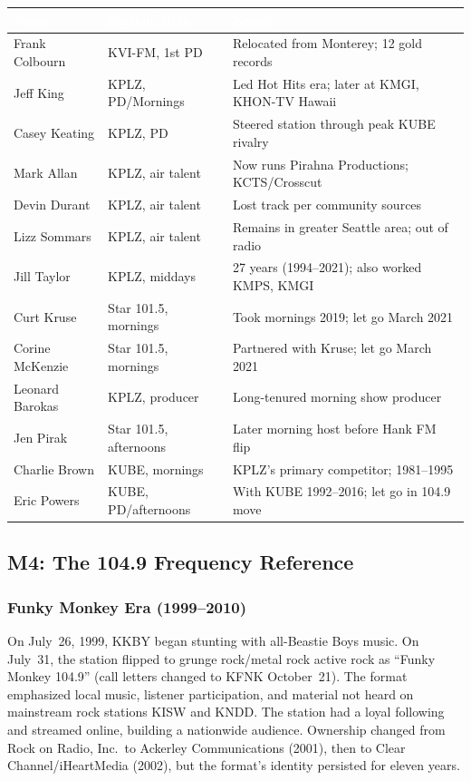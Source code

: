 \documentclass[11pt,letterpaper]{article}
\newcommand{\tableheader}[1]{\textbf{\sffamily\textcolor{white}{#1}}}
\begin{document}
\begin{center}
\begin{tabularx}{\textwidth}{L{3cm}L{2.5cm}X}
\toprule
{}
\tableheader{Name} & \tableheader{Station/Role} & \tableheader{Notes} \\
\midrule
Frank Colbourn & KVI-FM, 1st PD & Relocated from Monterey; 12 gold records \\
Jeff King & KPLZ, PD/Mornings & Led Hot Hits era; later at KMGI, KHON-TV Hawaii \\
Casey Keating & KPLZ, PD & Steered station through peak KUBE rivalry \\
Mark Allan & KPLZ, air talent & Now runs Pirahna Productions; KCTS/Crosscut \\
Devin Durant & KPLZ, air talent & Lost track per community sources \\
Lizz Sommars & KPLZ, air talent & Remains in greater Seattle area; out of radio \\
Jill Taylor & KPLZ, middays & 27 years (1994--2021); also worked KMPS, KMGI \\
Curt Kruse & Star 101.5, mornings & Took mornings 2019; let go March 2021 \\
Corine McKenzie & Star 101.5, mornings & Partnered with Kruse; let go March 2021 \\
Leonard Barokas & KPLZ, producer & Long-tenured morning show producer \\
Jen Pirak & Star 101.5, afternoons & Later morning host before Hank FM flip \\
Charlie Brown & KUBE, mornings & KPLZ's primary competitor; 1981--1995 \\
Eric Powers & KUBE, PD/afternoons & With KUBE 1992--2016; let go in 104.9 move \\
\bottomrule
\end{tabularx}
\end{center}

\subsection{M4: The 104.9 Frequency Reference}

\subsubsection{Funky Monkey Era (1999--2010)}

On July~26, 1999, KKBY began stunting with all-Beastie Boys music. On July~31, the station flipped to grunge rock/metal rock active rock as ``Funky Monkey 104.9'' (call letters changed to KFNK October~21). The format emphasized local music, listener participation, and material not heard on mainstream rock stations KISW and KNDD. The station had a loyal following and streamed online, building a nationwide audience. Ownership changed from Rock on Radio, Inc.\ to Ackerley Communications (2001), then to Clear Channel/iHeartMedia (2002), but the format's identity persisted for eleven years.
\end{document}
